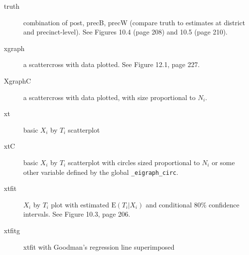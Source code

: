 \documentclass[11pt,titlepage]{article}
\newcommand{\Npp}{{N_i}}
\newcommand{\rE}{{\text{E}}}
\begin{document}
\begin{description}
\item[truth] combination of post, precB, precW (compare truth to
  estimates at district and precinct-level).  See Figures 10.4 (page
  208) and 10.5 (page 210).

\item[xgraph] a scattercross with data plotted.  See Figure 12.1, page
  227.

\item[XgraphC] a scattercross with data plotted, with size
  proportional to $N_i$.

\item[xt] basic $X_i$ by $T_i$ scatterplot

\item[xtC] basic $X_i$ by $T_i$ scatterplot with circles sized
  proportional to $\Npp$ or some other variable defined by the global
  \texttt{\_eigraph\_circ}.

\item[xtfit] $X_i$ by $T_i$ plot with estimated $\rE(T_i|X_i)$ and
  conditional 80\% confidence intervals.  See Figure 10.3, page 206.

\item[xtfitg] xtfit with Goodman's regression line superimposed
\end{description}
\end{document}
